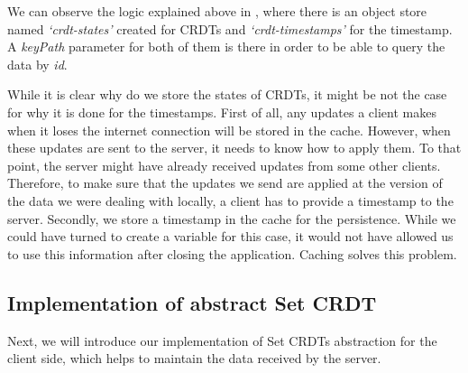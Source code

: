We can observe the logic explained above in , where there is an object store named \textit{`crdt-states'} created for CRDTs and \textit{`crdt-timestamps'} for the timestamp. A \textit{keyPath} parameter for both of them is there in order to be able to query the data by \textit{id}. 

While it is clear why do we store the states of CRDTs, it might be not the case for why it is done for the timestamps. First of all, any updates a client makes when it loses the internet connection will be stored in the cache. However, when these updates are sent to the server, it needs to know how to apply them. To that point, the server might have already received updates from some other clients. Therefore, to make sure that the updates we send are applied at the version of the data we were dealing with locally, a client has to provide a timestamp to the server. Secondly, we store a timestamp in the cache for the persistence. While we could have turned to create a variable for this case, it would not have allowed us to use this information after closing the application. Caching solves this problem.

\subsection*{Implementation of abstract Set CRDT}

Next, we will introduce our implementation of Set CRDTs abstraction for the client side, which helps to maintain the data received by the server.

